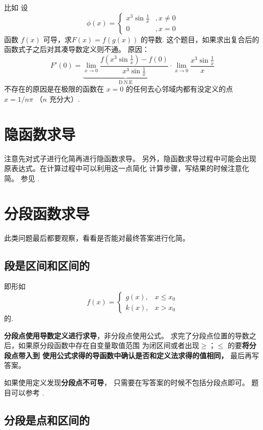 比如 设
\[
    \phi (x) = 
    \left\{
        \begin{array}{rl}
            x^3 \sin \frac{1}{x} &, x \neq 0 \\
            0  &, x = 0
        \end{array}
    \right.
\]
函数 $f(x)$ 可导，求$F(x)=f(g(x))$ 的导数.
这个题目，如果求出复合后的函数式子之后对其凑导数定义则不通。
原因：
\[
    F'(0) = \underbrace{\lim_{x \to 0} \dfrac{f(x^3 \sin \frac{1}{x}) - f(0)}{x^3 \sin \frac{1}{x}}}_{\mbox{D.N.E}}
    \cdot \lim_{x \to 0} \dfrac{x^3 \sin \frac{1}{x}}{x}
\]
不存在的原因是在极限的函数在 $x=0$ 的任何去心邻域内都有没定义的点 $x = 1/n\pi$ （$n$ 充分大）.

\section{隐函数求导}

注意先对式子进行化简再进行隐函数求导。
另外，隐函数求导过程中可能会出现原表达式。在计算过程中可以利用这一点简化
计算步骤，写结果的时候注意化简。
参见 \cite[quest35]{w660}.

\section{分段函数求导}

此类问题最后都要观察，看看是否能对最终答案进行化简。

\subsection{段是区间和区间的}

即形如
\[
    f(x) = 
    \left\{
        \begin{array}{rl}
            g(x), &x \leq x_0 \\
            k(x), &x > x_0
        \end{array}
    \right. 
\]
的.

\textbf{分段点使用导数定义进行求导}，非分段点使用公式。
求完了分段点位置的导数之后，如果原分段函数中存在自变量取值范围
为闭区间或者出现$\geq$；$\leq$ 的要\textbf{将分段点带入到
使用公式求得的导函数中确认是否和定义法求得的值相同，}
最后再写答案。

如果使用定义发现\textbf{分段点不可导}，
只需要在写答案的时候不包括分段点即可。
题目可以参考 \cite[quest26]{w660}.

\subsection{分段是点和区间的}

